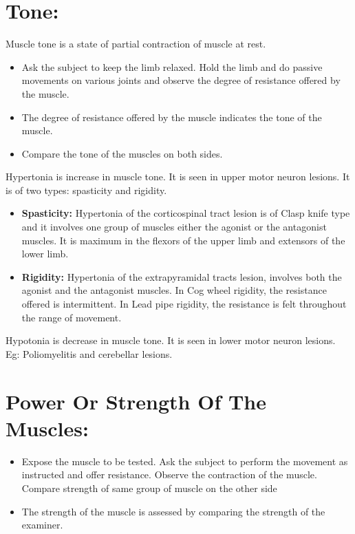 \documentclass[a4paper,12pt]{book}
\begin{document}
\section*{Tone:}
	Muscle tone is a state of partial contraction of muscle at rest.
	\begin{itemize}
\item{Ask the subject to keep the limb relaxed. Hold the limb and do passive movements on various joints and observe the degree of resistance offered by the muscle.}
\item{The degree of resistance offered by the muscle indicates the tone of the muscle.}
\item{Compare the tone of the muscles on both sides.}
	\end{itemize}
	\par
	Hypertonia is increase in muscle tone. It is seen in upper motor neuron lesions. It is of two types: spasticity and rigidity.
	\begin{itemize}
		\item{\textbf{Spasticity:} Hypertonia of the corticospinal tract lesion is of Clasp knife type and it involves one group of muscles either the agonist or the antagonist muscles. It is maximum in the flexors of the upper limb and extensors of the lower limb.}
		\item{\textbf{Rigidity:} Hypertonia of the extrapyramidal tracts lesion, involves both the agonist and the antagonist muscles. In Cog wheel rigidity, the resistance offered is intermittent. In Lead pipe rigidity, the resistance is felt throughout the range of movement.}
	\end{itemize}
	Hypotonia is decrease in muscle tone. It is seen in lower motor neuron lesions. Eg: Poliomyelitis and cerebellar lesions.
	\section*{Power Or Strength Of The Muscles:}
	\begin{itemize}
\item{Expose the muscle to be tested. Ask the subject to perform the movement as instructed and offer resistance. Observe the contraction of the muscle. Compare strength of same group of muscle on the other side}
\item{The strength of the muscle is assessed by comparing the  strength of the examiner.}
	\end{itemize}
\end{document}
